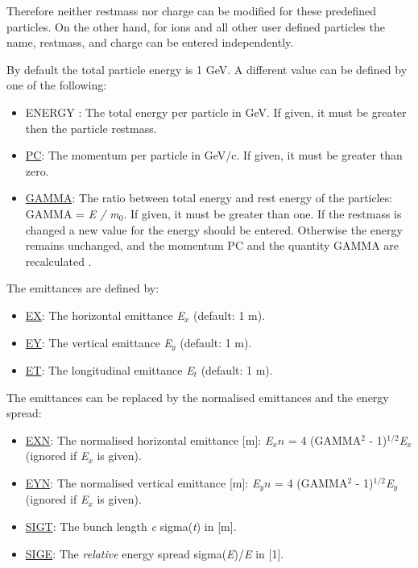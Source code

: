 Therefore neither restmass nor charge can be modified for these
predefined particles. On the other hand, for ions and all other user
defined particles the name, restmass, and charge can be entered
independently.  

By default the total particle energy is 1 GeV. A different value can be 
defined by one of the following: 
 
\begin{itemize}
   \item ENERGY \label{beam_energy}: The total energy per particle in
     GeV. If given, it must be greater then the particle restmass.  
   \item \href{pc}{PC}: The momentum per particle in GeV/c. If
     given, it must be greater than zero.  
   \item \href{gamma}{GAMMA}: The ratio between total energy and
     rest energy of the particles: GAMMA = \textit{E / m$_0$}. If
     given, it must be greater than one. If the restmass is changed
     a new value for the energy should be entered. Otherwise the
     energy remains unchanged, and the momentum PC and the quantity
     GAMMA are recalculated . 
\end{itemize}  

The emittances are defined by: 
\begin{itemize}
   \item \href{ex}{EX}: The horizontal emittance \textit{E$_x$} (default: 1 m). 
   \item \href{ey}{EY}: The vertical emittance \textit{E$_y$} (default: 1 m). 
   \item \href{et}{ET}: The longitudinal emittance \textit{E$_t$} (default: 1 m). 
\end{itemize}  

The emittances can be replaced by the normalised emittances and the
energy spread:  
\begin{itemize}
   \item \href{exn}{EXN}: The normalised horizontal emittance [m]:
     \textit{E$_xn$} = 4 (GAMMA$^2$ - 1)$^{1/2}$\textit{E$_x$} (ignored
     if \textit{E$_x$} is given).  
   \item \href{eyn}{EYN}: The normalised vertical emittance [m]:
     \textit{E$_yn$} = 4 (GAMMA$^2$ - 1)$^{1/2}$\textit{E$_y$} (ignored
     if \textit{E$_x$} is given).  
   \item \href{sigt}{SIGT}: The bunch length \textit{c}
     sigma(\textit{t}) in [m].  
   \item \href{sige}{SIGE}: The \emph{relative} energy spread
     sigma(\textit{E})/\textit{E} in [1].  
\end{itemize} 

